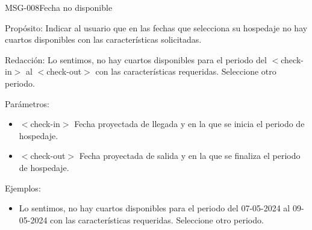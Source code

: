 \begin{cdtMessage}[msgErrorColor]{MSG-008}{Fecha no disponible} 
	\item[Propósito:] Indicar al usuario que en las fechas que selecciona su hospedaje no hay cuartos disponibles con las características solicitadas.
	\item[Redacción:] Lo sentimos, no hay cuartos disponibles para el periodo del $<$check-in$>$ al $<$check-out$>$ con las características requeridas. Seleccione otro periodo. 
	\item[Parámetros:] \hspace{1cm}
	\begin{itemize}
		\item $<$check-in$>$ Fecha proyectada de llegada y en la que se inicia el periodo de hospedaje.
		\item $<$check-out$>$ Fecha proyectada de salida y en la que se finaliza el periodo de hospedaje.
	\end{itemize}
	\item[Ejemplos:] \hspace{1cm}
	\begin{itemize}
		\item Lo sentimos, no hay cuartos disponibles para el periodo del 07-05-2024 al 09-05-2024 con las características requeridas. Seleccione otro periodo. 
	\end{itemize}
\end{cdtMessage}